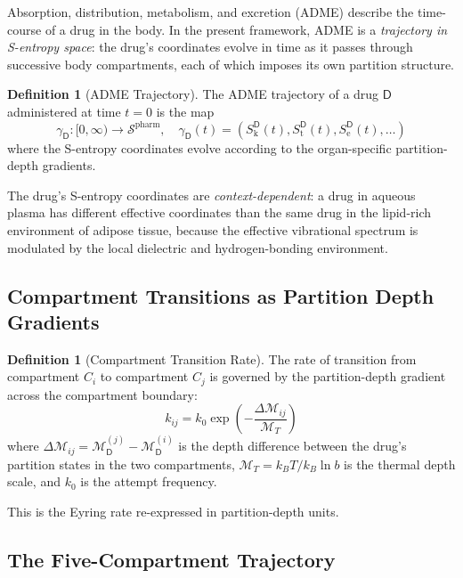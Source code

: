 \documentclass[11pt,twocolumn,a4paper]{article}
\theoremstyle{definition}
\newtheorem{definition}[theorem]{Definition}
\theoremstyle{remark}
\newcommand{\Sk}{S_{\mathrm{k}}}
\newcommand{\St}{S_{\mathrm{t}}}
\newcommand{\Se}{S_{\mathrm{e}}}
\newcommand{\Sspace}{\mathcal{S}}
\newcommand{\Depth}{\mathcal{M}}
\newcommand{\Drug}{\mathsf{D}}
\begin{document}
Absorption, distribution, metabolism, and excretion (ADME) describe the time-course of a drug in the body. In the present framework, ADME is a \emph{trajectory in S-entropy space}: the drug's coordinates evolve in time as it passes through successive body compartments, each of which imposes its own partition structure.

\begin{definition}[ADME Trajectory]
\label{def:adme_trajectory}
The ADME trajectory of a drug $\Drug$ administered at time $t = 0$ is the map
\begin{equation}
\gamma_\Drug: [0, \infty) \to \Sspace^{\mathrm{pharm}}, \quad \gamma_\Drug(t) = (\Sk^\Drug(t), \St^\Drug(t), \Se^\Drug(t), \ldots)
\end{equation}
where the S-entropy coordinates evolve according to the organ-specific partition-depth gradients.
\end{definition}

The drug's S-entropy coordinates are \emph{context-dependent}: a drug in aqueous plasma has different effective coordinates than the same drug in the lipid-rich environment of adipose tissue, because the effective vibrational spectrum is modulated by the local dielectric and hydrogen-bonding environment.

\subsection{Compartment Transitions as Partition Depth Gradients}

\begin{definition}[Compartment Transition Rate]
\label{def:compartment_rate}
The rate of transition from compartment $C_i$ to compartment $C_j$ is governed by the partition-depth gradient across the compartment boundary:
\begin{equation}
k_{ij} = k_0 \exp\left(-\frac{\Delta\Depth_{ij}}{\Depth_T}\right)
\end{equation}
where $\Delta\Depth_{ij} = \Depth^{(j)}_\Drug - \Depth^{(i)}_\Drug$ is the depth difference between the drug's partition states in the two compartments, $\Depth_T = k_B T / k_B \ln b$ is the thermal depth scale, and $k_0$ is the attempt frequency.
\end{definition}

This is the Eyring rate \citep{eyring1935} re-expressed in partition-depth units.

\subsection{The Five-Compartment Trajectory}
\end{document}
